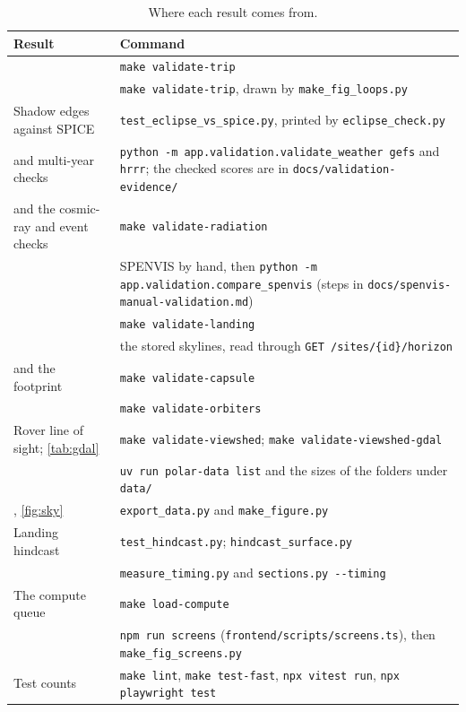 \documentclass[11pt,a4paper]{article}
\begin{document}
\begin{table}[htbp]
\centering\small
\caption{Where each result comes from.}
\label{tab:repro}
\begin{tabularx}{\textwidth}{@{}lY@{}}
\toprule
Result & Command \\
\midrule
{} & \texttt{make validate-trip} \\
 & \texttt{make validate-trip}, drawn by \texttt{make\_fig\_loops.py} \\
Shadow edges against SPICE & \texttt{test\_eclipse\_vs\_spice.py}, printed by
\texttt{eclipse\_check.py} \\
 and multi-year checks & \texttt{python -m app.validation.validate\_weather gefs}
and \texttt{hrrr}; the checked scores are in \texttt{docs/validation-evidence/} \\
 and the cosmic-ray and event checks & \texttt{make validate-radiation} \\
 & SPENVIS by hand, then \texttt{python -m app.validation.compare\_spenvis}
(steps in \texttt{docs/spenvis-manual-validation.md}) \\
 & \texttt{make validate-landing} \\
 & the stored skylines, read through \texttt{GET /sites/\{id\}/horizon} \\
 and the footprint & \texttt{make validate-capsule} \\
 & \texttt{make validate-orbiters} \\
Rover line of sight; \cref{tab:gdal} & \texttt{make validate-viewshed};
\texttt{make validate-viewshed-gdal} \\
 & \texttt{uv run polar-data list} and the sizes of the folders under \texttt{data/} \\
, \cref{fig:sky} & \texttt{export\_data.py} and
\texttt{make\_figure.py} \\
Landing hindcast & \texttt{test\_hindcast.py}; \texttt{hindcast\_surface.py} \\
 & \texttt{measure\_timing.py} and \texttt{sections.py -{}-timing} \\
The compute queue & \texttt{make load-compute} \\
 & \texttt{npm run screens} (\texttt{frontend/scripts/screens.ts}), then
\texttt{make\_fig\_screens.py} \\
Test counts & \texttt{make lint}, \texttt{make test-fast}, \texttt{npx vitest run},
\texttt{npx playwright test} \\
\bottomrule
\end{tabularx}
\end{table}
\end{document}
